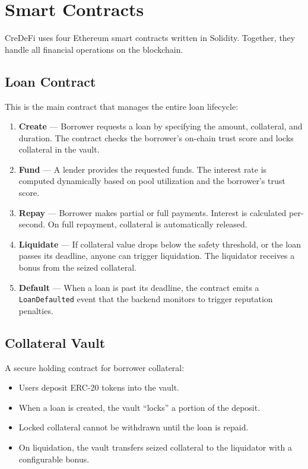 \documentclass[12pt, a4paper]{article}
\begin{document}
\section{Smart Contracts}

CreDeFi uses four Ethereum smart contracts written in Solidity. Together, they handle all financial operations on the blockchain.

\subsection{Loan Contract}

This is the main contract that manages the entire loan lifecycle:

\begin{enumerate}[nosep]
    \item \textbf{Create} --- Borrower requests a loan by specifying the amount, collateral, and duration. The contract checks the borrower's on-chain trust score and locks collateral in the vault.
    \item \textbf{Fund} --- A lender provides the requested funds. The interest rate is computed dynamically based on pool utilization and the borrower's trust score.
    \item \textbf{Repay} --- Borrower makes partial or full payments. Interest is calculated per-second. On full repayment, collateral is automatically released.
    \item \textbf{Liquidate} --- If collateral value drops below the safety threshold, or the loan passes its deadline, anyone can trigger liquidation. The liquidator receives a bonus from the seized collateral.
    \item \textbf{Default} --- When a loan is past its deadline, the contract emits a \texttt{LoanDefaulted} event that the backend monitors to trigger reputation penalties.
\end{enumerate}

\subsection{Collateral Vault}

A secure holding contract for borrower collateral:
\begin{itemize}[nosep]
    \item Users deposit ERC-20 tokens into the vault.
    \item When a loan is created, the vault ``locks'' a portion of the deposit.
    \item Locked collateral cannot be withdrawn until the loan is repaid.
    \item On liquidation, the vault transfers seized collateral to the liquidator with a configurable bonus.
\end{itemize}
\end{document}
